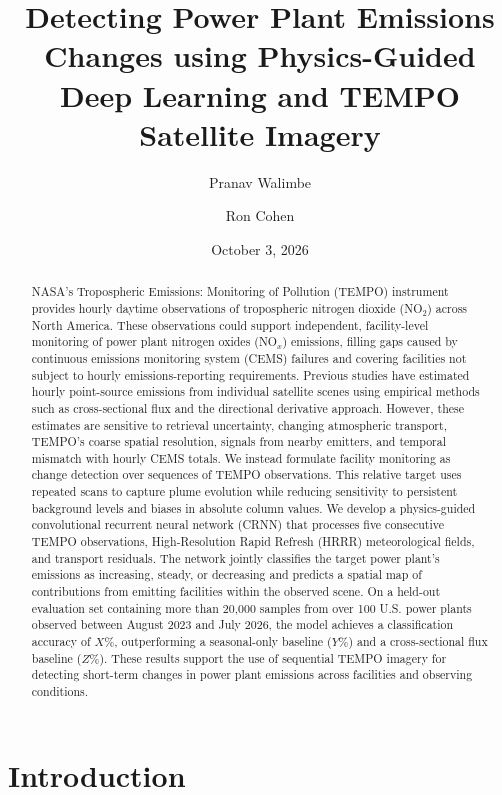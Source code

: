 \documentclass[sigconf,nonacm]{acmart}
\title{Detecting Power Plant \texorpdfstring{\NOx}{NOx} Emissions Changes using
Physics-Guided Deep Learning and TEMPO Satellite Imagery}
\author{Pranav Walimbe}
\affiliation{%
  \institution{University of California, Berkeley}
  \city{Berkeley}
  \state{California}
  \country{USA}
}
\author{Ron Cohen}
\affiliation{%
  \institution{University of California, Berkeley}
  \city{Berkeley}
  \state{California}
  \country{USA}
}
\date{October 3, 2026}
\newcommand{\NOx}{NO$_x$}
\begin{document}
\begin{abstract}
NASA's Tropospheric Emissions: Monitoring of Pollution (TEMPO) instrument
provides hourly daytime observations of tropospheric nitrogen dioxide
(NO$_2$) across North America. These observations could support independent,
facility-level monitoring of power plant nitrogen oxides (\NOx{}) emissions,
filling gaps caused by continuous emissions monitoring system (CEMS) failures
and covering facilities not subject to hourly emissions-reporting requirements.
Previous studies have estimated hourly point-source emissions from individual
satellite scenes using empirical methods such as cross-sectional flux and the
directional derivative approach. However, these estimates are sensitive to
retrieval uncertainty, changing atmospheric transport, TEMPO's coarse spatial
resolution, signals from nearby emitters, and temporal mismatch with hourly
CEMS totals. We instead formulate facility monitoring as change detection over
sequences of TEMPO observations. This relative target uses repeated scans to
capture plume evolution while reducing sensitivity to persistent background
levels and biases in absolute column values. We develop a physics-guided
convolutional recurrent neural network (CRNN) that processes five consecutive
TEMPO observations, High-Resolution Rapid Refresh (HRRR) meteorological fields,
and transport residuals. The network jointly classifies the target power plant's
emissions as increasing, steady, or decreasing and predicts a spatial map of
contributions from emitting facilities within the observed scene. On a held-out
evaluation set containing more than 20,000 samples from over 100 U.S. power
plants observed between August 2023 and July 2026, the model achieves a
classification accuracy of $X\%$, outperforming a seasonal-only baseline
($Y\%$) and a cross-sectional flux baseline ($Z\%$). These results support the
use of sequential TEMPO imagery for detecting short-term changes in power plant
emissions across facilities and observing conditions.
\end{abstract}

\maketitle

\section{Introduction}
\end{document}
